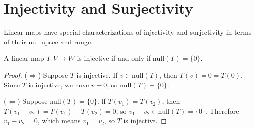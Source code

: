 \section{Injectivity and Surjectivity}

Linear maps have special characterizations of injectivity and surjectivity in terms of their null space and range.

\begin{theorem}
\label{injective-characterization}
A linear map $T : V \to W$ is injective if and only if $\text{null}(T) = \{0\}$.
\end{theorem}
\begin{proof}
($\Rightarrow$) Suppose $T$ is injective. If $v \in \text{null}(T)$, then $T(v) = 0 = T(0)$. Since $T$ is injective, we have $v = 0$, so $\text{null}(T) = \{0\}$.

($\Leftarrow$) Suppose $\text{null}(T) = \{0\}$. If $T(v_1) = T(v_2)$, then $T(v_1 - v_2) = T(v_1) - T(v_2) = 0$, so $v_1 - v_2 \in \text{null}(T) = \{0\}$. Therefore $v_1 - v_2 = 0$, which means $v_1 = v_2$, so $T$ is injective.
\end{proof}

